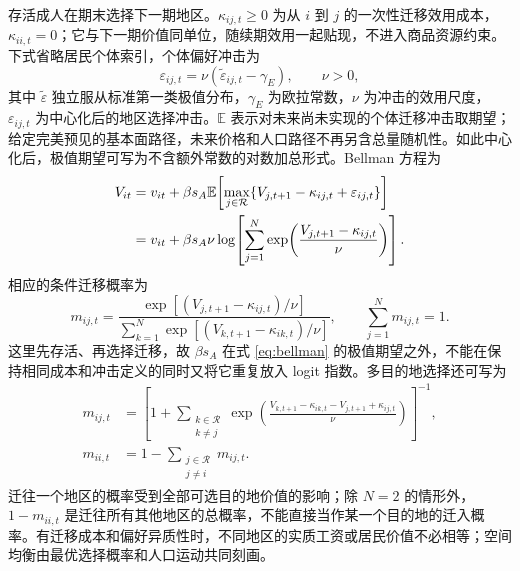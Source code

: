\documentclass[UTF8,a4paper,zihao=-4,fontset=windows]{ctexart}
\numberwithin{equation}{section}
\newcommand{\E}{\mathbb E}
\begin{document}
存活成人在期末选择下一期地区。$\kappa_{ij,t}\geq0$ 为从 $i$ 到 $j$ 的一次性迁移效用成本，$\kappa_{ii,t}=0$；它与下一期价值同单位，随续期效用一起贴现，不进入商品资源约束。下式省略居民个体索引，个体偏好冲击为
\begin{equation}
  \varepsilon_{ij,t}=\nu(\widetilde\varepsilon_{ij,t}-\gamma_E),
  \qquad \nu>0,
  \label{eq:migration-shocks}
\end{equation}
其中 $\widetilde\varepsilon$ 独立服从标准第一类极值分布，$\gamma_E$ 为欧拉常数，$\nu$ 为冲击的效用尺度，$\varepsilon_{ij,t}$ 为中心化后的地区选择冲击。$\E$ 表示对未来尚未实现的个体迁移冲击取期望；给定完美预见的基本面路径，未来价格和人口路径不再另含总量随机性。如此中心化后，极值期望可写为不含额外常数的对数加总形式。Bellman 方程为
\begin{align}
  V_{it}
   &=v_{it}+\beta s_A\E\!\left[
       \max_{j\in\mathcal R}
       \{V_{j,t+1}-\kappa_{ij,t}+\varepsilon_{ij,t}\}\right]\notag\\
   &=v_{it}+\beta s_A\nu
       \log\!\left[\sum_{j=1}^N
       \exp\!\left(\frac{V_{j,t+1}-\kappa_{ij,t}}{\nu}\right)\right].
  \label{eq:bellman}
\end{align}
相应的条件迁移概率为
\begin{equation}
  m_{ij,t}=
   \frac{\exp[(V_{j,t+1}-\kappa_{ij,t})/\nu]}
        {\sum_{k=1}^N\exp[(V_{k,t+1}-\kappa_{ik,t})/\nu]},
  \qquad \sum_{j=1}^Nm_{ij,t}=1.
  \label{eq:migration-probability}
\end{equation}
这里先存活、再选择迁移，故 $\beta s_A$ 在式 \eqref{eq:bellman} 的极值期望之外，不能在保持相同成本和冲击定义的同时又将它重复放入 logit 指数。多目的地选择还可写为
\begin{align}
  m_{ij,t}
    &=\left[1+\sum_{\substack{k\in\mathcal R\\k\ne j}}
      \exp\!\left(\frac{V_{k,t+1}-\kappa_{ik,t}
                        -V_{j,t+1}+\kappa_{ij,t}}{\nu}\right)\right]^{-1},
      \label{eq:multi-destination-choice}\\
  m_{ii,t}&=1-\sum_{\substack{j\in\mathcal R\\j\ne i}}m_{ij,t}.
      \label{eq:multi-region-retention}
\end{align}
迁往一个地区的概率受到全部可选目的地价值的影响；除 $N=2$ 的情形外，$1-m_{ii,t}$ 是迁往所有其他地区的总概率，不能直接当作某一个目的地的迁入概率。有迁移成本和偏好异质性时，不同地区的实质工资或居民价值不必相等；空间均衡由最优选择概率和人口运动共同刻画。
\end{document}
